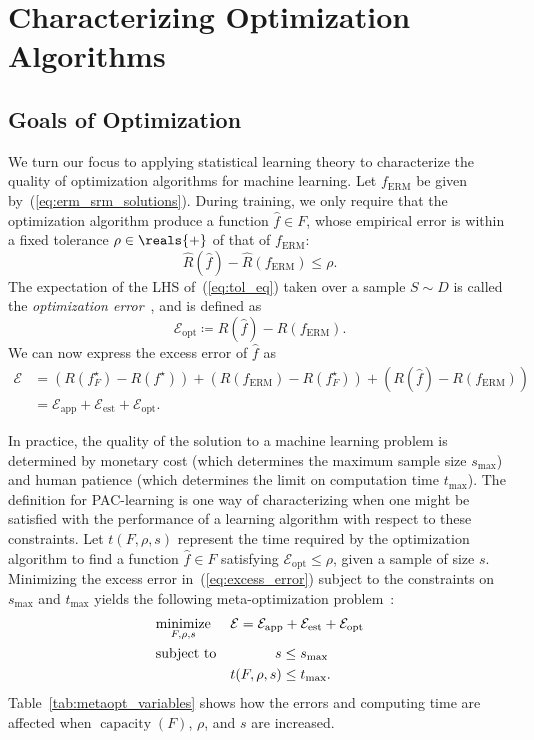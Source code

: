 \documentclass[11pt,a4paper]{article}
\numberwithin{equation}{section}
\newcommand{\capacity}{\operatorname{capacity}}
\newcommand{\apperr}{\mathcal{E}_{\mathrm{app}}}
\newcommand{\esterr}{\mathcal{E}_{\mathrm{est}}}
\newcommand{\opterr}{\mathcal{E}_{\mathrm{opt}}}
\begin{document}
\section{Characterizing Optimization Algorithms}

\subsection{Goals of Optimization}

We turn our focus to applying statistical learning theory to characterize the
quality of optimization algorithms for machine learning. Let $f_{\text{ERM}}$ be
given by~(\ref{eq:erm_srm_solutions}). During training, we only require that the
optimization algorithm produce a function $\hat{f} \in F$, whose empirical error
is within a fixed tolerance $\rho \in \reals{+}$ of that of $f_{\text{ERM}}$:
\begin{equation}
	\hat{R}(\hat{f}) - \hat{R}(f_{\text{ERM}}) \leq \rho.
	\label{eq:tol_eq}
\end{equation}
The expectation of the LHS of~(\ref{eq:tol_eq}) taken over a sample $S \sim D$
is called the \emph{optimization error}~\citep{bousquet2008tradeoffs}, and is
defined as
\[
	\opterr \coloneqq R(\hat{f}) - R(f_{\text{ERM}}).
\]
We can now express the excess error of $\hat{f}$ as
\begin{align}
	\mathcal{E}
	&= (R(f_F^\star) - R(f^\star)) + (R(f_{\text{ERM}}) - R(f_F^\star)) +
		(R(\hat{f}) - R(f_{\text{ERM}})) \\
	&= \apperr + \esterr + \opterr.
	\label{eq:excess_error}
\end{align}

In practice, the quality of the solution to a machine learning problem is
determined by monetary cost (which determines the maximum sample size
$s_{\text{max}}$) and human patience (which determines the limit on
computation time $t_{\text{max}}$). The definition for PAC-learning is one way
of characterizing when one might be satisfied with the performance of a learning
algorithm with respect to these constraints. Let $t(F, \rho, s)$ represent the
time required by the optimization algorithm to find a function $\hat{f} \in F$
satisfying $\opterr \leq \rho$, given a sample of size $s$. Minimizing the
excess error in~(\ref{eq:excess_error}) subject to the constraints on
$s_{\text{max}}$ and $t_{\text{max}}$ yields the following meta-optimization
problem~\citep{bousquet2008tradeoffs}:
\begin{equation}
\begin{aligned}
	& \underset{F, \rho, s}{\text{minimize}} & &
		\mathcal{E} = \apperr + \esterr + \opterr \\
	& \text{subject to} & & \hspace{3.2em} s \leq s_{\text{max}} \\
	& & & t(F, \rho, s) \leq t_{\text{max}}.
\end{aligned}
\label{eq:metaopt_program}
\end{equation}
Table~\ref{tab:metaopt_variables} shows how the errors and computing time are
affected when $\capacity(F)$, $\rho$, and $s$ are increased.
\end{document}
